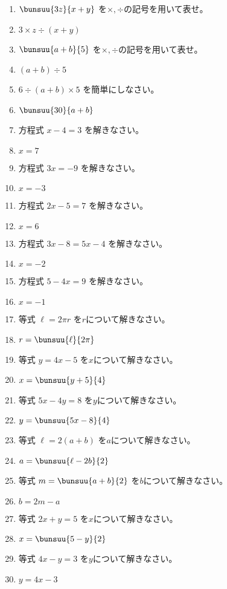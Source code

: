\documentclass[uplatex,a4j,11pt]{jsreport}
\begin{document}
\begin{multicols}{2}
\begin{enumerate}
    \item $\bunsuu{3z}{x+y}$ を$\times,\div$の記号を用いて表せ。%
    \item $3\times z \div (x+y)$
    \item $\bunsuu{a+b}{5}$ を$\times,\div$の記号を用いて表せ。%
    \item $(a+b)\div 5$
    \item $6\div (a+b)\times 5$ を簡単にしなさい。%
    \item $\bunsuu{30}{a+b}$
    \item 方程式 $x-4=3$ を解きなさい。%
    \item $x=7$
    \item 方程式 $3x=-9$ を解きなさい。%
    \item $x=-3$
    \item 方程式 $2x-5=7$ を解きなさい。%
    \item $x=6$
    \item 方程式 $3x-8=5x-4$ を解きなさい。%
    \item $x=-2$
    \item 方程式 $5-4x=9$ を解きなさい。%
    \item $x=-1$
    \item 等式 $\ell=2\pi r$ を$r$について解きなさい。%
    \item $r=\bunsuu{\ell}{2\pi}$
    \item 等式 $y=4x-5$ を$x$について解きなさい。%
    \item $x=\bunsuu{y+5}{4}$
    \item 等式 $5x-4y=8$ を$y$について解きなさい。%
    \item $y=\bunsuu{5x-8}{4}$
    \item 等式 $\ell=2(a+b)$ を$a$について解きなさい。%
    \item $a=\bunsuu{\ell-2b}{2}$
    \item 等式 $m=\bunsuu{a+b}{2}$ を$b$について解きなさい。%
    \item $b=2m-a$
    \item 等式 $2x+y=5$ を$x$について解きなさい。%
    \item $x=\bunsuu{5-y}{2}$
    \item 等式 $4x-y=3$ を$y$について解きなさい。%
    \item $y=4x-3$

\end{enumerate}
\end{multicols}
\end{document}
